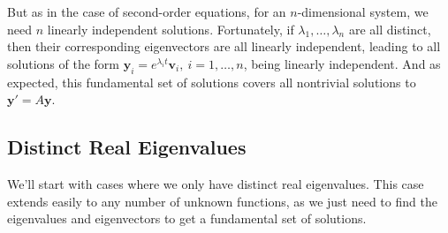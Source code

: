 \documentclass[letterpaper, 11pt, openany]{book}
\theoremstyle{mytheoremstyle}
\theoremstyle{myexamplestyle}
\begin{document}
But as in the case of second-order equations, for an \(n\)-dimensional system, we need \(n\) linearly independent solutions. Fortunately, if \(\lambda_{1}, \ldots, \lambda_{n}\) are all distinct, then their corresponding eigenvectors are all linearly independent, leading to all solutions of the form \(\mathbf{y}_{i} = e^{\lambda_{i} t} \mathbf{v}_{i}, \ i = 1, \ldots ,n\), being linearly independent. And as expected, this fundamental set of solutions covers all nontrivial solutions to \(\mathbf{y}' = A \mathbf{y}\).

\subsection{Distinct Real Eigenvalues}

We'll start with cases where we only have distinct real eigenvalues. This case extends easily to any number of unknown functions, as we just need to find the eigenvalues and eigenvectors to get a fundamental set of solutions.
\end{document}
